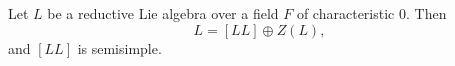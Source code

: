 Let $L$ be a reductive Lie algebra over a field $F$ of characteristic $0$. Then
$$L = [LL] \oplus Z(L),$$
and $[LL]$ is semisimple.
